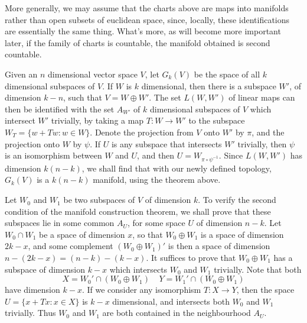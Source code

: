 More generally, we may assume that the charts above are maps into manifolds rather than open subsets of euclidean space, since, locally, these identifications are essentially the same thing. What's more, as will become more important later, if the family of charts is countable, the manifold obtained is second countable.

\begin{example}
    Given an $n$ dimensional vector space $V$, let $G_k(V)$ be the space of all $k$ dimensional subspaces of $V$. If $W$ is $k$ dimensional, then there is a subspace $W'$, of dimension $k - n$, such that $V = W \oplus W'$. The set $L(W,W')$ of linear maps can then be identified with the set $A_{W'}$ of $k$ dimensional subspaces of $V$ which intersect $W'$ trivially, by taking a map $T: W \to W'$ to the subspace $W_T = \{ w + Tw : w \in W \}$. Denote the projection from $V$ onto $W'$ by $\pi$, and the projection onto $W$ by $\psi$. If $U$ is any subspace that intersects $W'$ trivially, then $\psi$ is an isomorphism between $W$ and $U$, and then $U = W_{\pi \circ \psi^{-1}}$. Since $L(W,W')$ has dimension $k(n-k)$, we shall find that with our newly defined topology, $G_k(V)$ is a $k(n-k)$ manifold, using the theorem above.

    Let $W_0$ and $W_1$ be two subspaces of $V$ of dimension $k$. To verify the second condition of the manifold construction theorem, we shall prove that these subspaces lie in some common $A_U$, for some space $U$ of dimension $n - k$. Let $W_0 \cap W_1$ be a space of dimension $x$, so that $W_0 \oplus W_1$ is a space of dimension $2k - x$, and some complement $(W_0 \oplus W_1)'$ is then a space of dimension $n - (2k - x) = (n - k) - (k - x)$. It suffices to prove that $W_0 \oplus W_1$ has a subspace of dimension $k - x$ which intersects $W_0$ and $W_1$ trivially. Note that both
    \[ X = W_0' \cap (W_0 \oplus W_1)\ \ \ \ \ Y = W_1' \cap (W_0 \oplus W_1) \]
    have dimension $k - x$. If we consider any isomorphism $T: X \to Y$, then the space $U = \{ x + Tx : x \in X \}$ is $k-x$ dimensional, and intersects both $W_0$ and $W_1$ trivially. Thus $W_0$ and $W_1$ are both contained in the neighbourhood $A_U$.


\end{example}
